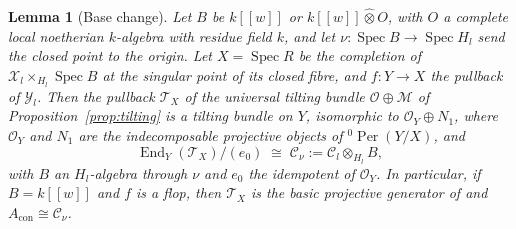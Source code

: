 \documentclass[11pt]{amsart}
\numberwithin{table}{section}
\numberwithin{figure}{section}
\numberwithin{equation}{section}
\newtheorem{lem}[thm]{Lemma}
\theoremstyle{definition}
\theoremstyle{plain}
\newcommand{\Acon}{A_{\mathrm{con}}}
\newcommand{\cC}{\mathcal{C}}
\newcommand{\cO}{\mathcal{O}}
\newcommand{\cX}{\mathcal{X}}
\newcommand{\cY}{\mathcal{Y}}
\DeclareMathOperator{\Spec}{Spec}
\DeclareMathOperator{\End}{End}
\DeclareMathOperator{\Per}{Per}
\begin{document}
\begin{lem}[Base change]\label{lem:basechange}
Let $B$ be $k[[w]]$ or $k[[w]] \mathbin{\hat\otimes} O$, with $O$ a complete local noetherian $k$-algebra with residue field $k$, and let $\nu\colon \Spec B \to \Spec H_l$ send the closed point to the origin. Let $X = \Spec R$ be the completion of $\cX_l \times_{H_l} \Spec B$ at the singular point of its closed fibre, and $f\colon Y \to X$ the pullback of $\cY_l$. Then the pullback $\mathcal T_X$ of the universal tilting bundle $\cO \oplus \mathcal M$ of Proposition~\ref{prop:tilting} is a tilting bundle on $Y$, isomorphic to $\cO_Y \oplus N_1$, where $\cO_Y$ and $N_1$ are the indecomposable projective objects of ${}^0\Per(Y/X)$, and
\[
\End_Y(\mathcal T_X)/(e_0) \;\cong\; \cC_\nu := \cC_l \otimes_{H_l} B ,
\]
with $B$ an $H_l$-algebra through $\nu$ and $e_0$ the idempotent of $\cO_Y$. In particular, if $B = k[[w]]$ and $f$ is a flop, then $\mathcal T_X$ is the basic projective generator of \cite[\S2.4, Def~2.12]{DW} and $\Acon \cong \cC_\nu$.
\end{lem}
\end{document}
